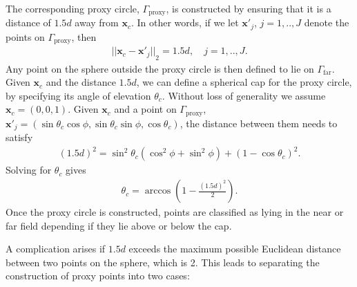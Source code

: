 \documentclass{sfuthesis}
\begin{document}
The corresponding proxy circle, $\Gamma_{\text{proxy}}$, is constructed by ensuring that it is a distance of $1.5d$ away from $\mathbf{x}_c$. In other words, if we let $\mathbf{x}'_j$, $j=1, .., J$ denote the points on $\Gamma_{\text{proxy}}$, then 
\begin{align*}
	{||\mathbf{x}_c-\mathbf{x}'_j||}_2=1.5d, \quad j=1,..,J.
\end{align*}
Any point on the sphere outside the proxy circle is then defined to lie on $\Gamma_{\text{far}}$. 
Given $\mathbf{x}_c$ and the distance $1.5d$, we can define a spherical cap for the proxy circle, by specifying its angle of elevation $\theta_c$.  Without loss of generality we assume $\mathbf{x}_c=(0,0,1)$. Given $\mathbf{x}_c$ and a point on $\Gamma_\text{proxy}$, $\mathbf{x}'_j=(\sin \theta_c \cos \phi, \sin \theta_c \sin \phi, \cos \theta_c)$, the distance between them needs to satisfy 
\begin{align*}
	{(1.5d)}^2=\sin^2 \theta_c (\cos^2 \phi+\sin^2 \phi)+{(1-\cos \theta_c)}^2.
\end{align*}
Solving for $\theta_c$ gives 
\begin{align*}
	\theta_c=\arccos \left(1-\frac{{(1.5d)}^2}{2} \right).
\end{align*}
Once the proxy circle is constructed, points are classified as lying in the near or far field depending if they lie above or below the cap. 

A complication arises if $1.5d$ exceeds the maximum possible Euclidean distance between two points on the sphere, which is 2. This leads to separating the construction of proxy points into two cases: 
\end{document}
